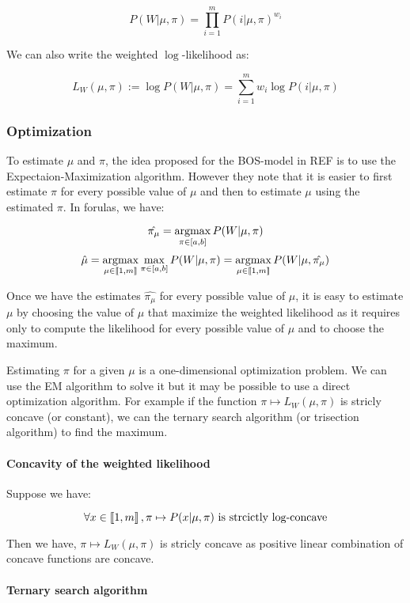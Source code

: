 $$P(W | \mu, \pi) = \prod_{i=1}^m P(i | \mu, \pi)^{w_i}$$

We can also write the weighted $\log$-likelihood as:

$$L_W(\mu, \pi) := \log P(W | \mu, \pi) = \sum_{i=1}^m w_i \log P(i | \mu, \pi)$$


\subsubsection{Optimization}
\label{sec:univariate_generic_estimation}

To estimate $\mu$ and $\pi$, the idea proposed for the BOS-model in REF is to use the Expectaion-Maximization algorithm. However they note that it is easier to first estimate $\pi$ for every possible value of $\mu$ and then to estimate $\mu$ using the estimated $\pi$. In forulas, we have:


$$\hat{\pi_{\mu}} = \operatorname*{argmax}_{\pi \in [a, b]} P(W | \mu, \pi)$$
$$\hat{\mu} = \operatorname*{argmax}_{\mu \in \left\llbracket1, m\right\rrbracket} \max_{\pi \in [a, b]} P(W | \mu, \pi) = \operatorname*{argmax}_{\mu \in \left\llbracket1, m\right\rrbracket} P(W | \mu, \hat{\pi_{\mu}})$$

Once we have the estimates $\hat{\pi_{\mu}}$ for every possible value of $\mu$, it is easy to estimate $\mu$ by choosing the value of $\mu$ that maximize the weighted likelihood as it requires only to compute the likelihood for every possible value of $\mu$ and to choose the maximum.

Estimating $\pi$ for a given $\mu$ is a one-dimensional optimization problem. We can use the EM algorithm to solve it but it may be possible to use a direct optimization algorithm. For example if the function $\pi \mapsto L_W(\mu, \pi)$ is stricly concave (or constant), we can the ternary search algorithm (or trisection algorithm) to find the maximum.

\paragraph{Concavity of the weighted likelihood}

Suppose we have:

$$\forall x \in \left\llbracket1, m\right\rrbracket, \pi \mapsto P(x | \mu, \pi) \text{ is strcictly $\log$-concave}$$

Then we have, $\pi \mapsto L_W(\mu, \pi)$ is stricly concave as positive linear combination of concave functions are concave.

\paragraph{Ternary search algorithm}


